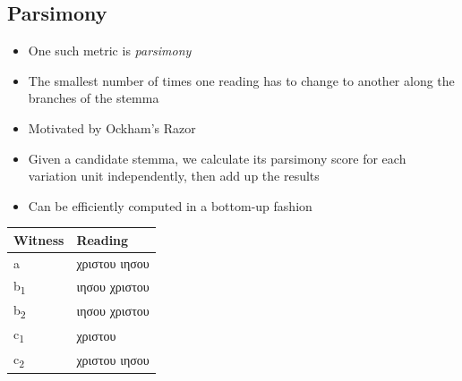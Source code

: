 \documentclass[10pt]{beamer}
\begin{document}
	\subsection{Parsimony}
	\begin{frame}
		\begin{itemize}
			\item One such metric is \emph{parsimony}
			\item The smallest number of times one reading has to change to another along the branches of the stemma
			\item Motivated by Ockham's Razor
			\item Given a candidate stemma, we calculate its parsimony score for each variation unit independently, then add up the results
			\item Can be efficiently computed in a bottom-up fashion
		\end{itemize}
		\begin{center}
			\setmainfont[Ligatures=Common]{EB Garamond}
			\renewfontfamily{}
			\begin{tabular}{|l|l|}
				\hline
				Witness & Reading\\
				\hline
				\hline
				a & {\color{red}\textgreek{χριστου ιησου}}\\
				\hline
				b\textsubscript{1} & {\color{blue}\textgreek{ιησου χριστου}}\\
				\hline
				b\textsubscript{2} & {\color{blue}\textgreek{ιησου χριστου}}\\
				\hline
				c\textsubscript{1} & {\color{darkgreen}\textgreek{χριστου}}\\
				\hline
				c\textsubscript{2} & {\color{red}\textgreek{χριστου ιησου}}\\
				\hline
			\end{tabular}
		\end{center}
	\end{frame}
\end{document}
